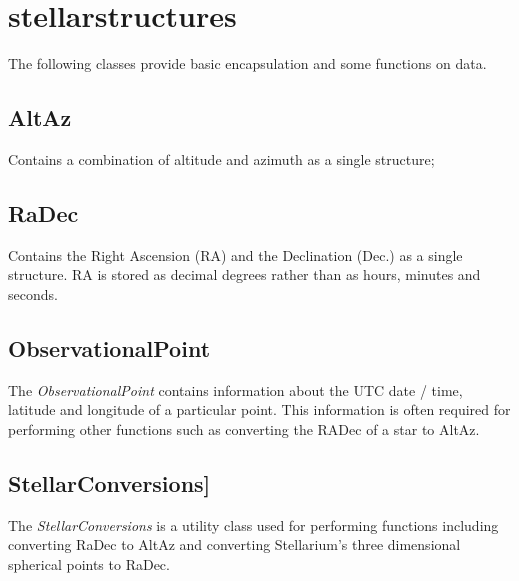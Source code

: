 \section{stellarstructures} \label{sec:stellarstructures}
The following classes provide basic encapsulation and some functions on data.

\subsection{AltAz}
Contains a combination of altitude and azimuth as a single structure;

\subsection{RaDec}\label{sec:RaDec}
Contains the Right Ascension (RA) and the Declination (Dec.) as a single structure. RA is stored as decimal degrees rather than as hours, minutes and seconds.

\subsection{ObservationalPoint}
The \textit{ObservationalPoint} contains information about the UTC date / time, latitude and longitude of a particular point. This information is often required for performing other functions such as converting the RADec of a star to AltAz.

\subsection{StellarConversions]}
 The \textit{StellarConversions} is a utility class used for performing functions including converting RaDec to AltAz and converting Stellarium's three dimensional spherical points to RaDec.
 

